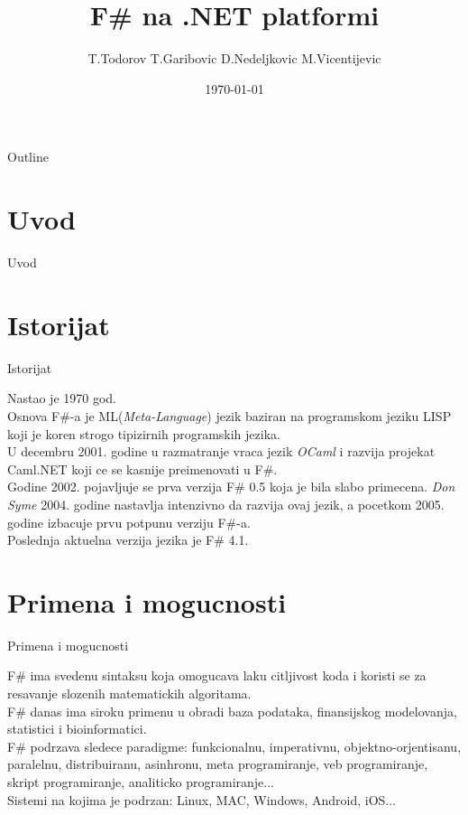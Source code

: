 \documentclass{beamer}
\title{F\# na .NET platformi}
\author{T.Todorov T.Garibovic D.Nedeljkovic M.Vicentijevic}
\date{\today}
\begin{document}
\begin{frame}
  \titlepage
\end{frame}

\begin{frame}{Outline}
  \tableofcontents
\end{frame}

\section{Uvod}

\begin{frame}{Uvod}

\end{frame}

\section{Istorijat}
\begin{frame}{Istorijat}
 
Nastao je 1970 god. \\
Osnova F\#-a je ML({\em Meta-Language}) jezik baziran na programskom jeziku LISP koji je koren strogo tipizirnih programskih jezika. \\
U decembru 2001. godine u razmatranje vraca jezik {\em OCaml} i razvija projekat Caml.NET koji ce se kasnije preimenovati u F\#. \\
Godine 2002. pojavljuje se prva verzija F\# 0.5 koja je bila slabo primecena. {\em Don Syme} 2004. godine nastavlja intenzivno da razvija ovaj jezik, a pocetkom 2005. godine izbacuje prvu potpunu verziju F\#-a. \\
Poslednja aktuelna verzija jezika je F\# 4.1.

\end{frame}

\section{Primena i mogucnosti}
\begin{frame}{Primena i mogucnosti}

F\# ima svedenu sintaksu koja omogucava laku citljivost koda i koristi se za resavanje slozenih matematickih algoritama.  \\
F\# danas ima siroku primenu u obradi baza podataka, finansijskog modelovanja, statistici i bioinformatici. \\
F\# podrzava sledece paradigme: funkcionalnu, imperativnu, objektno-orjentisanu, paralelnu, distribuiranu, asinhronu, meta programiranje, veb programiranje, skript programiranje, analiticko programiranje... \\
Sistemi na kojima je podrzan: Linux, MAC, Windows, Android, iOS... 
\end{frame}
\end{document}
